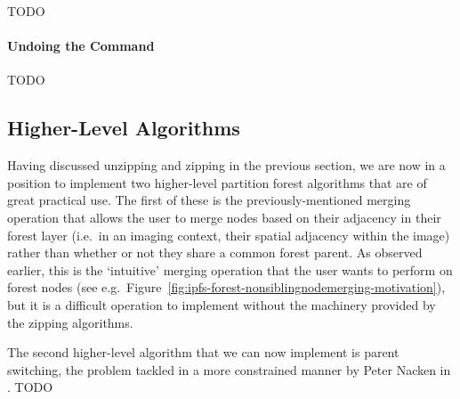 TODO

\paragraph{Undoing the Command}

TODO

\subsection{Higher-Level Algorithms}

Having discussed unzipping and zipping in the previous section, we are now in a position to implement two higher-level partition forest algorithms that are of great practical use. The first of these is the previously-mentioned merging operation that allows the user to merge nodes based on their adjacency in their forest layer (i.e.~in an imaging context, their spatial adjacency within the image) rather than whether or not they share a common forest parent. As observed earlier, this is the `intuitive' merging operation that the user wants to perform on forest nodes (see e.g.~Figure~\ref{fig:ipfs-forest-nonsiblingnodemerging-motivation}), but it is a difficult operation to implement without the machinery provided by the zipping algorithms.

The second higher-level algorithm that we can now implement is parent switching, the problem tackled in a more constrained manner by Peter Nacken in \cite{nacken95}. TODO